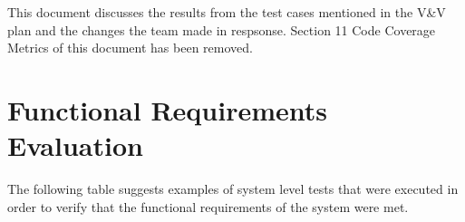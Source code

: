 \documentclass[12pt, titlepage]{article}
\begin{document}

\newpage

\tableofcontents

\listoftables %

\listoffigures %

\newpage


This document discusses the results from the test cases mentioned in the V\&V plan and the changes the team made in respsonse. 
Section 11 Code Coverage Metrics of this document has been removed.

\section{Functional Requirements Evaluation}

\noindent The following table suggests examples of system level tests that were executed in order to verify that the functional requirements of the system were met.
\end{document}
